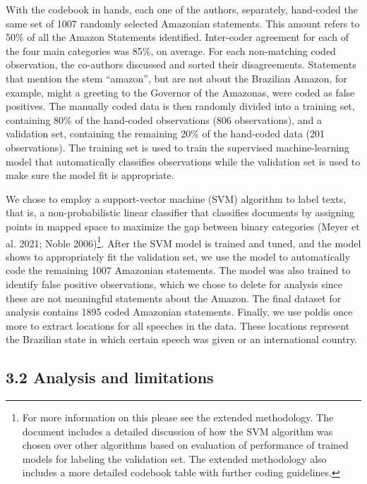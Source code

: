\documentclass[
]{article}
\begin{document}
With the codebook in hands, each one of the authors, separately,
hand-coded the same set of 1007 randomly selected Amazonian statements.
This amount refers to 50\% of all the Amazon Statements identified.
Inter-coder agreement for each of the four main categories was 85\%, on
average. For each non-matching coded observation, the co-authors
discussed and sorted their disagreements. Statements that mention the
stem ``amazon'', but are not about the Brazilian Amazon, for example,
might a greeting to the Governor of the Amazonas, were coded as false
positives. The manually coded data is then randomly divided into a
training set, containing 80\% of the hand-coded observations (806
observations), and a validation set, containing the remaining 20\% of
the hand-coded data (201 observations). The training set is used to
train the supervised machine-learning model that automatically
classifies observations while the validation set is used to make sure
the model fit is appropriate.

We chose to employ a support-vector machine (SVM) algorithm to label
texts, that is, a non-probabilistic linear classifier that classifies
documents by assigning points in mapped space to maximize the gap
between binary categories (Meyer et al. 2021; Noble 2006)\footnote{For
  more information on this please see the extended methodology. The
  document includes a detailed discussion of how the SVM algorithm was
  chosen over other algorithms based on evaluation of performance of
  trained models for labeling the validation set. The extended
  methodology also includes a more detailed codebook table with further
  coding guidelines.}. After the SVM model is trained and tuned, and the
model shows to appropriately fit the validation set, we use the model to
automatically code the remaining 1007 Amazonian statements. The model
was also trained to identify false positive observations, which we chose
to delete for analysis since these are not meaningful statements about
the Amazon. The final dataset for analysis contains 1895 coded Amazonian
statements. Finally, we use poldis once more to extract locations for
all speeches in the data. These locations represent the Brazilian state
in which certain speech was given or an international country.

\hypertarget{analysis-and-limitations}{%
\subsection{3.2 Analysis and
limitations}\label{analysis-and-limitations}}
\end{document}

